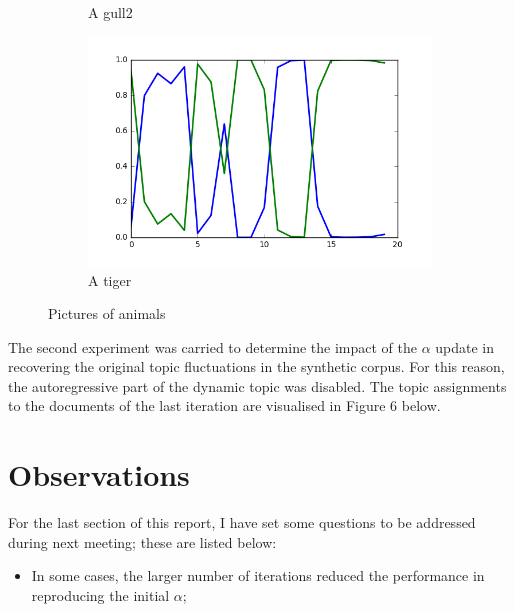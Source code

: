 \documentclass[12pt]{article}
\begin{document}
\begin{figure}[H]
\begin{subfigure}[b]{0.33\textwidth}
                \caption{A gull2}
                \label{fig:gull2}
        \end{subfigure}%
        \begin{subfigure}[b]{0.33\textwidth}
                \includegraphics[width=\linewidth]{var-init-10_var-prop-5_iter-500}
                \caption{A tiger}
                \label{fig:tiger}
        \end{subfigure}
        \caption{Pictures of animals}\label{fig:animals}
\end{figure}

\par The second experiment was carried to determine the impact of the $\alpha$ update in recovering the original topic fluctuations in the synthetic corpus. For this reason, the autoregressive part of the dynamic topic was disabled. The topic assignments to the documents of the last iteration are visualised in Figure 6 below.

\section*{Observations}

\par For the last section of this report, I have set some questions to be addressed during next meeting; these are listed below:
\begin{itemize}
	\item In some cases, the larger number of iterations reduced the performance in reproducing the initial $\alpha$;
\end{itemize}
\end{document}
